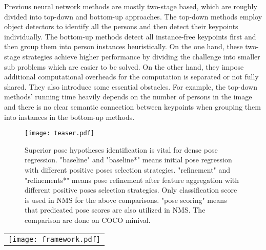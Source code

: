 \documentclass[11pt,twocolumn,journal]{IEEEtran}
\newcommand{\SMPR}{SMPR}
\begin{document}
Previous neural network methods are mostly two-stage based, which are roughly divided into top-down and bottom-up approaches. 
The top-down methods \cite{chen2018cascaded, gkioxari2014using, fang2017rmpe, rogez2019lcr, sun2011articulated, sun2019deep} employ object detectors to identify all the persons and then detect their keypoints individually. 
The bottom-up methods \cite{cao2017realtime, insafutdinov2016deepercut, newell2017associative, pishchulin2016deepcut, papandreou2018personlab} detect all instance-free keypoints first and then group them into person instances heuristically.
On the one hand, these two-stage strategies achieve higher performance by dividing the challenge into smaller sub problems which are easier to be solved. On the other hand, they impose additional computational overheads for the computation is separated or not fully shared. They also introduce some essential obstacles. For example, the top-down methods' running time heavily depends on the number of persons in the image and there is no clear semantic connection between keypoints when grouping them into instances in the bottom-up methods.

\begin{figure}[t]
\setlength{\belowcaptionskip}{-0.7cm} 
\texttt{[image: teaser.pdf]}
\caption{Superior pose hypotheses identification
is vital for dense pose regression. "baseline" and "baseline*" means initial pose regression with different positive poses selection strategies. "refinement" and "refinements*" means pose refinement after feature aggregation with different positive poses selection strategies. Only classification score is used in NMS for the above comparisons. "pose scoring" means that predicated pose scores are also utilized in NMS. The comparison are done on COCO minival. 
}
\label{fig_teaser}
\end{figure}

\begin{figure*}[t]
\begin{center}
\begin{tabular}{@{}c@{}}
\texttt{[image: framework.pdf]}
\end{tabular}
\end{center}
\vspace{-2mm}
\caption{Overview of the proposed \SMPR. \SMPR~adopts a FPN backbone. 
We only draw the afterwards pipeline of one scale of FPN feature maps for clear illustration. There are 5 heads for the feature maps from level 3 to level 7. 
Each head has two subnets: one pose regression and the other for location classification which labels the locations on the feature maps with “person” or “not person”. The regression subnet has three branches aiming for initial pose estimation (location + offsets 1), final pose regression (location + offsets 1 + offsets 2) and scoring. 
In the head for feature level 3, a heatmap prediction subnet is included to assist training.
}
\label{fig_framework}
\end{figure*}
\end{document}
